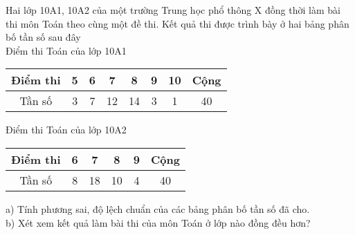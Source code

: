\begin{bt}%
	Hai lớp 10A1, 10A2 của một trường Trung học phổ thông X đồng thời làm bài thi môn Toán theo cùng một đề thi. Kết quả thi được trình bày ở hai bảng phân bố tần số sau đây\\
	Điểm thi Toán của lớp 10A1
	\begin{center}
		\begin{tabular}{|c|c|c|c|c|c|c|c|} 
			\hline Điểm thi & 5 & 6 & 7 & 8 &9 &10&Cộng \\ 
			\hline Tần số & 3 & 7 & 12 & 14 &3 &1&40 \\ 
			\hline 
		\end{tabular}
	\end{center}
	Điểm thi Toán của lớp 10A2
	\begin{center}
		\begin{tabular}{|c|c|c|c|c|c|} 
			\hline Điểm thi & 6 & 7 & 8 & 9 & Cộng \\ 
			\hline Tần số & 8 & 18 & 10 & 4 & 40 \\ 
			\hline 
		\end{tabular}
	\end{center}
	a) Tính phương sai, độ lệch chuẩn của các bảng phân bố tần số đã cho.\\
	b) Xét xem kết quả làm bài thi của môn Toán ở lớp nào đồng đều hơn?
\end{bt}


